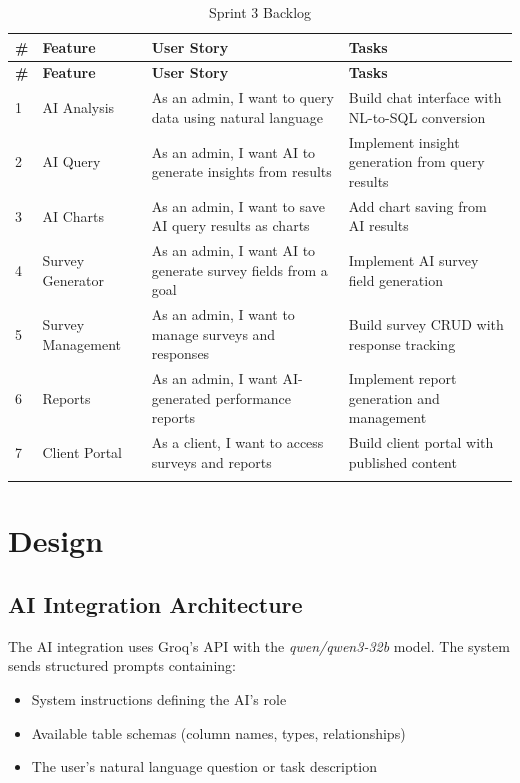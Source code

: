 \documentclass[12pt,a4paper]{report}
\begin{document}
\begin{table}[H]\begin{tabular}{|p{0.5cm}|p{2.5cm}|p{4cm}|p{2.5cm}|}
\hline
\textbf{\#} & \textbf{Feature} & \textbf{User Story} & \textbf{Tasks} \\
\hline

\hline
\textbf{\#} & \textbf{Feature} & \textbf{User Story} & \textbf{Tasks} \\
\hline

1 & AI Analysis & As an admin, I want to query data using natural language & Build chat interface with NL-to-SQL conversion \\
2 & AI Query & As an admin, I want AI to generate insights from results & Implement insight generation from query results \\
3 & AI Charts & As an admin, I want to save AI query results as charts & Add chart saving from AI results \\
4 & Survey Generator & As an admin, I want AI to generate survey fields from a goal & Implement AI survey field generation \\
5 & Survey Management & As an admin, I want to manage surveys and responses & Build survey CRUD with response tracking \\
6 & Reports & As an admin, I want AI-generated performance reports & Implement report generation and management \\
7 & Client Portal & As a client, I want to access surveys and reports & Build client portal with published content \\
\hline
\caption{Sprint 3 Backlog}
\end{tabular}\end{table}

\section{Design}

\subsection{AI Integration Architecture}

The AI integration uses Groq's API with the \textit{qwen/qwen3-32b} model. The system sends structured prompts containing:
\begin{itemize}
    \item System instructions defining the AI's role
    \item Available table schemas (column names, types, relationships)
    \item The user's natural language question or task description
\end{itemize}
\end{document}
